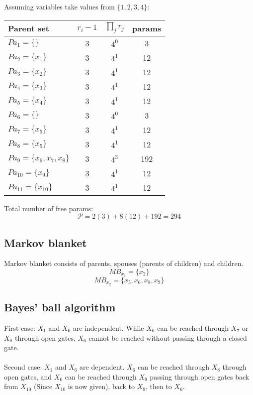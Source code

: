 \documentclass[9pt,twocolumn]{article}
\begin{document}
    Assuming variables take values from $\{1,2,3,4\}$:
    \begin{center}
    \begin{tabular}{|l|c|c|c|} 
    \hline
    Parent set & $r_i-1$ & $\prod_j{r_j}$ & params\\
    \hline
    $Pa_1 = \{\}$ & 3 & $4^0$ & 3\\
    $Pa_2 = \{x_1\}$ & 3 & $4^1$ & 12\\
    $Pa_3 = \{x_2\}$ & 3 & $4^1$ & 12\\
    $Pa_4 = \{x_3\}$ & 3 & $4^1$ & 12\\
    $Pa_5 = \{x_4\}$ & 3 & $4^1$ & 12\\
    $Pa_6 = \{\}$ & 3 & $4^0$ & 3\\
    $Pa_7 = \{x_5\}$ & 3 & $4^1$ & 12\\
    $Pa_8 = \{x_5\}$ & 3 & $4^1$ & 12\\
    $Pa_9 = \{x_6,x_7,x_8\}$ & 3 & $4^3$ & 192\\
    $Pa_10 = \{x_9\}$ & 3 & $4^1$ & 12\\
    $Pa_11 = \{x_{10}\}$ & 3 & $4^1$ & 12\\
    \hline
    \end{tabular}
    \end{center}
    Total number of free params:
    \begin{equation}
        \mathcal{P} = 2(3)+8(12)+192=294
    \end{equation}

    \subsection{Markov blanket}
    Markov blanket consists of parents, spouses (parents of children) and children.
    \begin{equation}
        MB_{x_1} = \{x_2\}
    \end{equation}
    \begin{equation}
        MB_{x_2} = \{x_5, x_6, x_8, x_9\}
    \end{equation}

    \subsection{Bayes' ball algorithm}
    First case: $X_1$ and $X_6$ are independent. While $X_6$ can be reached through $X_7$ or $X_8$ through open gates, $X_6$ cannot be reached without passing through a closed gate.\\\\Second case: $X_1$ and $X_6$ are dependent. $X_6$ can be reached through $X_8$ through open gates, and $X_6$ can be reached through $X_9$ passing through open gates back from $X_{10}$ (Since $X_{10}$ is now given), back to $X_9$, then to $X_6$.
\end{document}
